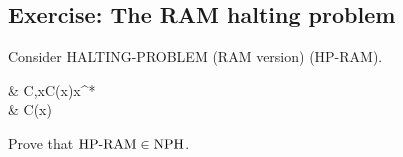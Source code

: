 \subsection{Exercise: The RAM halting problem}
Consider HALTING-PROBLEM (RAM version) (HP-RAM).

\begin{notesproblem}
 & \langle C,x\rangle\text{, }C(x)x\in\bits^*\\
 & C(x)
\end{notesproblem}

Prove that $\mathrm{HP\text{-}RAM}\in\mathrm{NPH}$.
